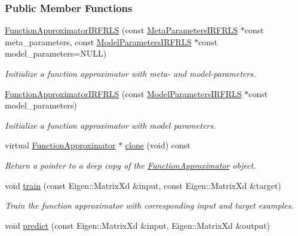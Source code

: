 \subsubsection*{Public Member Functions}
\begin{DoxyCompactItemize}
\item 
\hyperlink{classDmpBbo_1_1FunctionApproximatorIRFRLS_ac41e9652816c7a26cb5bd3591c87f027}{Function\+Approximator\+I\+R\+F\+R\+L\+S} (const \hyperlink{classDmpBbo_1_1MetaParametersIRFRLS}{Meta\+Parameters\+I\+R\+F\+R\+L\+S} $\ast$const meta\+\_\+parameters, const \hyperlink{classDmpBbo_1_1ModelParametersIRFRLS}{Model\+Parameters\+I\+R\+F\+R\+L\+S} $\ast$const model\+\_\+parameters=N\+U\+L\+L)
\begin{DoxyCompactList}\small\item\em Initialize a function approximator with meta-\/ and model-\/parameters. \end{DoxyCompactList}\item 
\hyperlink{classDmpBbo_1_1FunctionApproximatorIRFRLS_a73cc6ae1afcc97d85774b142ea0755a1}{Function\+Approximator\+I\+R\+F\+R\+L\+S} (const \hyperlink{classDmpBbo_1_1ModelParametersIRFRLS}{Model\+Parameters\+I\+R\+F\+R\+L\+S} $\ast$const model\+\_\+parameters)
\begin{DoxyCompactList}\small\item\em Initialize a function approximator with model parameters. \end{DoxyCompactList}\item 
virtual \hyperlink{classDmpBbo_1_1FunctionApproximator}{Function\+Approximator} $\ast$ \hyperlink{classDmpBbo_1_1FunctionApproximatorIRFRLS_ad792a46ac006916c5c1ffed2fa42dd24}{clone} (void) const 
\begin{DoxyCompactList}\small\item\em Return a pointer to a deep copy of the \hyperlink{classDmpBbo_1_1FunctionApproximator}{Function\+Approximator} object. \end{DoxyCompactList}\item 
void \hyperlink{classDmpBbo_1_1FunctionApproximatorIRFRLS_ac453415cf4894aba45e8db6ebc4cd4dc}{train} (const Eigen\+::\+Matrix\+Xd \&input, const Eigen\+::\+Matrix\+Xd \&target)
\begin{DoxyCompactList}\small\item\em Train the function approximator with corresponding input and target examples. \end{DoxyCompactList}\item 
void \hyperlink{classDmpBbo_1_1FunctionApproximatorIRFRLS_afe8dcfb9cd065dfde38dce1f6e6cd3e6}{predict} (const Eigen\+::\+Matrix\+Xd \&input, Eigen\+::\+Matrix\+Xd \&output)

\end{DoxyCompactItemize}
